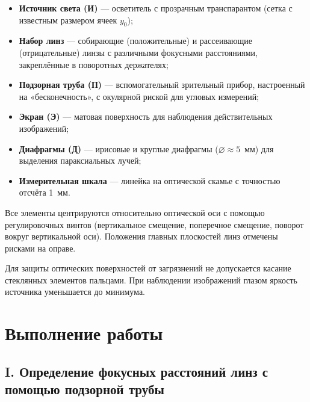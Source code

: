 \documentclass[a4paper]{article}
\begin{document}
\begin{itemize}
    \item \textbf{Источник света (И)} --- осветитель с прозрачным транспарантом (сетка с известным размером ячеек $y_0$);
    \item \textbf{Набор линз} --- собирающие (положительные) и рассеивающие (отрицательные) линзы с различными фокусными расстояниями, закреплённые в поворотных держателях;
    \item \textbf{Подзорная труба (П)} --- вспомогательный зрительный прибор, настроенный на «бесконечность», с окулярной риской для угловых измерений;
    \item \textbf{Экран (Э)} --- матовая поверхность для наблюдения действительных изображений;
    \item \textbf{Диафрагмы (Д)} --- ирисовые и круглые диафрагмы ($\varnothing \approx 5$~мм) для выделения параксиальных лучей;
    \item \textbf{Измерительная шкала} --- линейка на оптической скамье с точностью отсчёта 1~мм.
\end{itemize}

Все элементы центрируются относительно оптической оси с помощью регулировочных винтов (вертикальное смещение, поперечное смещение, поворот вокруг вертикальной оси). Положения главных плоскостей линз отмечены рисками на оправе.

Для защиты оптических поверхностей от загрязнений не допускается касание стеклянных элементов пальцами. При наблюдении изображений глазом яркость источника уменьшается до минимума.

\section{Выполнение работы}

\subsection{I. Определение фокусных расстояний линз с помощью подзорной трубы}
\end{document}
